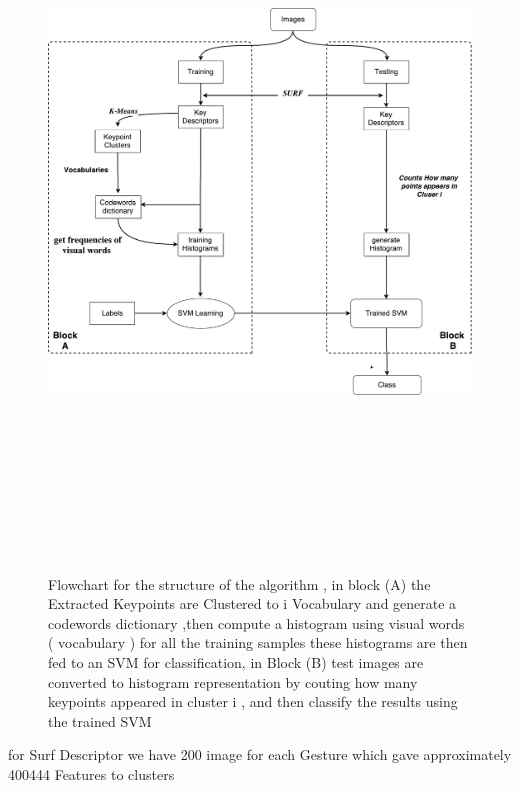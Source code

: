 \begin{figure}[H]
\centering
\includegraphics[width=17cm, height=19.5cm ]{img/myalgo.pdf}
\caption{Flowchart for the structure of the algorithm , in block (A) the Extracted Keypoints  are Clustered to i Vocabulary and generate a codewords dictionary  ,then compute a histogram using visual words ( vocabulary ) for all the training samples these histograms are then fed to an SVM for classification, in Block (B) test images are converted to histogram representation by couting how many keypoints appeared in cluster i ,  and then classify the results using the trained SVM }
\label{fig:algo1}
\end{figure}

\newpage

for Surf Descriptor we have 200 image for each Gesture  which gave approximately 400444 Features to clusters 

